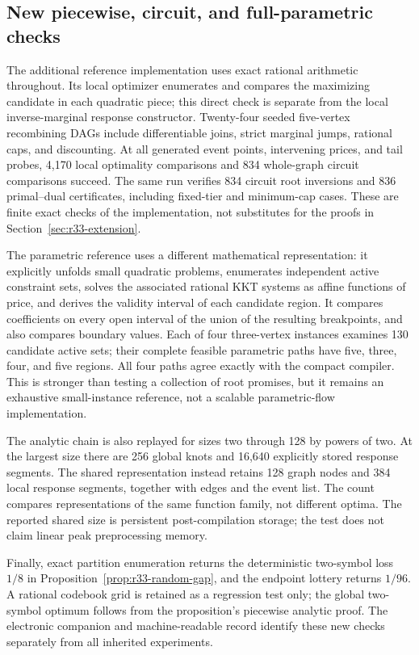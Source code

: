 \subsection{New piecewise, circuit, and full-parametric checks}\label{sec:r33-evidence}
The additional reference implementation uses exact rational arithmetic throughout. Its local optimizer enumerates and compares the maximizing candidate in each quadratic piece; this direct check is separate from the local inverse-marginal response constructor. Twenty-four seeded five-vertex recombining DAGs include differentiable joins, strict marginal jumps, rational caps, and discounting. At all generated event points, intervening prices, and tail probes, 4,170 local optimality comparisons and 834 whole-graph circuit comparisons succeed. The same run verifies 834 circuit root inversions and 836 primal--dual certificates, including fixed-tier and minimum-cap cases. These are finite exact checks of the implementation, not substitutes for the proofs in Section~\ref{sec:r33-extension}.

The parametric reference uses a different mathematical representation: it explicitly unfolds small quadratic problems, enumerates independent active constraint sets, solves the associated rational KKT systems as affine functions of price, and derives the validity interval of each candidate region. It compares coefficients on every open interval of the union of the resulting breakpoints, and also compares boundary values. Each of four three-vertex instances examines 130 candidate active sets; their complete feasible parametric paths have five, three, four, and five regions. All four paths agree exactly with the compact compiler. This is stronger than testing a collection of root promises, but it remains an exhaustive small-instance reference, not a scalable parametric-flow implementation.

The analytic chain is also replayed for sizes two through 128 by powers of two. At the largest size there are 256 global knots and 16,640 explicitly stored response segments. The shared representation instead retains 128 graph nodes and 384 local response segments, together with edges and the event list. The count compares representations of the same function family, not different optima. The reported shared size is persistent post-compilation storage; the test does not claim linear peak preprocessing memory.

Finally, exact partition enumeration returns the deterministic two-symbol loss $1/8$ in Proposition~\ref{prop:r33-random-gap}, and the endpoint lottery returns $1/96$. A rational codebook grid is retained as a regression test only; the global two-symbol optimum follows from the proposition's piecewise analytic proof. The electronic companion and machine-readable record identify these new checks separately from all inherited experiments.
